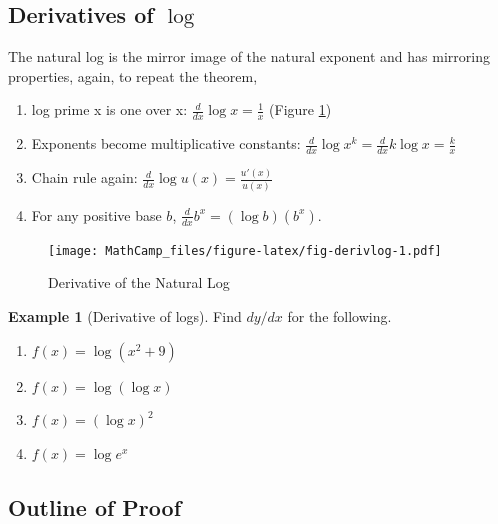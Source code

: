 \documentclass[
]{book}
\providecommand{\tightlist}{%
  \setlength{\itemsep}{0pt}\setlength{\parskip}{0pt}}
\theoremstyle{definition}
\theoremstyle{definition}
\newtheorem{example}{Example}[chapter]
\theoremstyle{definition}
\theoremstyle{definition}
\theoremstyle{remark}
\begin{document}
\hypertarget{derivatives-of-log}{%
\subsection*{\texorpdfstring{Derivatives of \(\log\)}{Derivatives of \textbackslash log}}\label{derivatives-of-log}}

The natural log is the mirror image of the natural exponent and has mirroring properties, again, to repeat the theorem,

\begin{enumerate}
\def\labelenumi{\arabic{enumi}.}
\tightlist
\item
  log prime x is one over x: \(\frac{d}{dx} \log x = \frac{1}{x}\) (Figure \ref{fig:fig-derivlog})
\item
  Exponents become multiplicative constants: \(\frac{d}{dx} \log x^k = \frac{d}{dx} k \log x = \frac{k}{x}\)
\item
  Chain rule again: \(\frac{d}{dx} \log u(x) = \frac{u'(x)}{u(x)}\quad\)
\item
  For any positive base \(b\), \(\frac{d}{dx} b^x = (\log b)\left(b^x\right)\).
\end{enumerate}

\begin{figure}
\centering
\texttt{[image: MathCamp\_files/figure-latex/fig-derivlog-1.pdf]}
\caption{\label{fig:fig-derivlog}Derivative of the Natural Log}
\end{figure}

\begin{example}[Derivative of logs]
\protect\hypertarget{exm:exmderivlog}{}{\label{exm:exmderivlog} {} }Find \(dy/dx\) for the following.

\begin{enumerate}
\def\labelenumi{\arabic{enumi}.}
\tightlist
\item
  \(f(x)=\log(x^2+9)\)
\item
  \(f(x)=\log(\log x)\)
\item
  \(f(x)=(\log x)^2\)
\item
  \(f(x)=\log e^x\)
\end{enumerate}
\end{example}

\hypertarget{outline-of-proof}{%
\subsection*{Outline of Proof}\label{outline-of-proof}}
\end{document}
